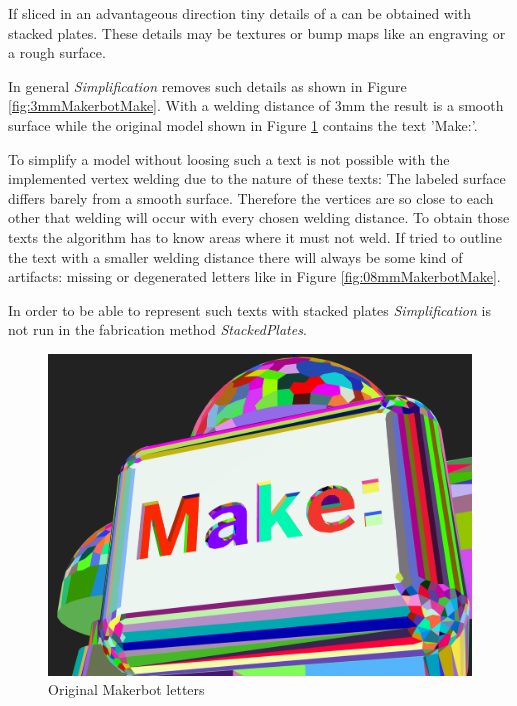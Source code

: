 \documentclass[../ClassicThesis.tex]{subfiles}
\begin{document}
If sliced in an advantageous direction tiny details of a {\threedmodel} can be obtained with stacked plates. These details may be textures or bump maps like an engraving or a rough surface.

In general \emph{Simplification} removes such details as shown in Figure \ref{fig:3mmMakerbotMake}. With a welding distance of 3mm the result is a smooth surface while the original model shown in Figure \ref{fig:origMakerbotMake} contains the text 'Make:'.

To simplify a model without loosing such a text is not possible with the implemented vertex welding due to the nature of these texts: The labeled surface differs barely from a smooth surface. Therefore the vertices are so close to each other that welding will occur with every chosen welding distance. To obtain those texts the algorithm has to know areas where it must not weld. If tried to outline the text with a smaller welding distance there will always be some kind of artifacts: missing or degenerated letters like in Figure \ref{fig:08mmMakerbotMake}.

In order to be able to represent such texts with stacked plates \emph{Simplification} is not run in the fabrication method \emph{StackedPlates}.


\begin{figure}
\includegraphics[width=0.8\columnwidth]{Images/04-approx-welding-make-unwelded.png}
\caption{Original Makerbot letters}
\label{fig:origMakerbotMake}
\end{figure}
\end{document}
